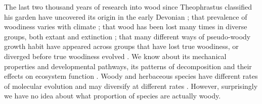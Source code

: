 \documentclass[12pt]{article}
\begin{document}
The last two thousand years of research into wood since Theophrastus
classified his garden have uncovered its origin in the early Devonian
\citep[$\sim$~400 mya;][]{gerrienne2011simple}; that prevalence of
woodiness varies with climate \citep{Molesheihgt}; that wood has been
lost many times in diverse groups, both extant and extinction \citep{judd1994}; that
many different ways of pseudo-woody growth habit have appeared across
groups that have lost true woodiness, or diverged before true
woodiness evolved  \citep{Cornwellwood}.  We know about its mechanical properties and
developmental pathways, its patterns of decomposition and their
effects on ecosystem function \citep{Cornwellwood}.  Woody and
herbaceous species have different rates of molecular evolution and
may diversify at different rates \citep{SmithDonoghue}.
%
However, surprisingly we have no idea about what proportion of species
are actually woody.


%
\end{document}
